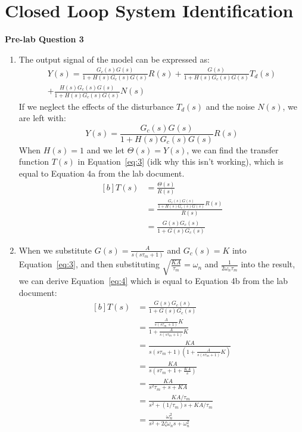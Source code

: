 \documentclass[12pt]{article}
\begin{document}
\section{Closed Loop System Identification}
\textbf{Pre-lab Question 3}
\begin{enumerate}[label=(\roman*)]
    \item The output signal of the model can be expressed as:
    \begin{multline*}
        Y(s) = \frac{G_c(s)G(s)}{1+H(s)G_c(s)G(s)}R(s) + \frac{G(s)}{1+H(s)G_c(s)G(s)}T_d(s) \\ + \frac{H(s)G_c(s)G(s)}{1+H(s)G_c(s)G(s)}N(s)
    \end{multline*}
    If we neglect the effects of the disturbance $T_d(s)$ and the noise $N(s)$, we are left with:
    \begin{equation*}
        Y(s) = \frac{G_c(s)G(s)}{1+H(s)G_c(s)G(s)}R(s)
    \end{equation*}
    When $H(s) = 1$ and we let $\Theta(s) = Y(s)$, we can find the transfer function $T(s)$ in Equation~\ref{eq:3} (idk why this isn't working), which is equal to Equation 4a from the lab document.
    \begin{equation} \label{eq:3}
    \begin{aligned}[b]
        T(s) &= \frac{\Theta(s)}{R(s)} \\
        &= \frac{\frac{G_c(s)G(s)}{1+H(s)G_c(s)G(s)}R(s)}{R(s)} \\
        &= \frac{G(s)G_c(s)}{1+G(s)G_c(s)}
    \end{aligned}
    \end{equation}
    \item When we substitute $G(s) = \frac{A}{s(s\tau_m+1)}$ and $G_c(s) = K$ into Equation~\ref{eq:3}, and then substituting $\sqrt{\frac{KA}{\tau_m}} = \omega_n $ and $\frac{1}{2\omega_n\tau_m}$ into the result, we can derive Equation~\ref{eq:4} which is equal to Equation 4b from the lab document:
    \begin{equation} \label{eq:4}
    \begin{aligned}[b]
        T(s) &= \frac{G(s)G_c(s)}{1+G(s)G_c(s)} \\
        &= \frac{\frac{A}{s(s\tau_m+1)}K} {1 + \frac{A}{s(s\tau_m+1)} K} \\
        &= \frac{KA}{s(s\tau_m+1)(1+\frac{A}{s(s\tau_m+1)}K)} \\
        &= \frac{KA}{s(s\tau_m + 1 + \frac{KA}{s})} \\
        &= \frac{KA}{s^2\tau_m + s + KA} \\
        &= \frac{KA / \tau_m}{s^2 + (1/\tau_m)s + KA / \tau_m} \\
        &= \frac{\omega_n^2}{s^2 + 2\zeta\omega_ns + \omega_n^2}
    \end{aligned}
    \end{equation}
\end{enumerate}
\end{document}
